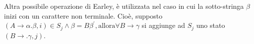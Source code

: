 \documentclass{subfiles}
\begin{document}
Altra possibile operazione di Earley, è utilizzata nel caso in cui la sotto-stringa \(\beta\) inizi con un carattere non terminale.
Cioè, supposto \((A \to \alpha . \beta , i) \in S_{j} \land \beta = B\beta^{'}, \text{allora} \forall B \to \gamma\) si aggiunge ad \(S_{j}\)
uno stato \((B \to .\gamma, j)\).
\end{document}
